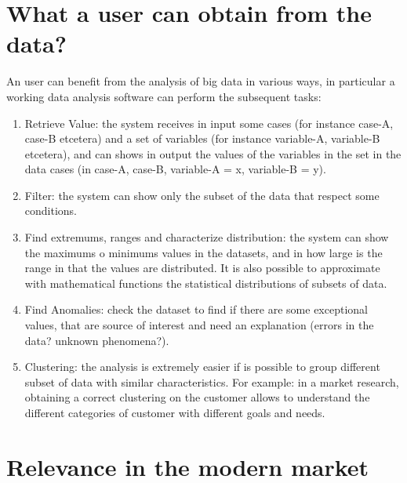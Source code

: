 \section{What a user can obtain from the data?}

An user can benefit from the analysis of big data in various ways, in particular a working data analysis software can perform the subsequent tasks:

\begin{enumerate}

\item Retrieve Value: the system receives in input some cases (for instance case-A, case-B etcetera) and a set of variables (for instance variable-A, variable-B etcetera), and can shows in output the values of the variables in the set in the data cases (in case-A, case-B, variable-A = x, variable-B = y).

\item Filter: the system can show only the subset of the data that respect some conditions.

\item Find extremums, ranges and characterize distribution: the system can show the maximums o minimums values in the datasets, and in how large is the range in that the values are distributed. It is also possible to approximate with mathematical functions the statistical distributions of subsets of data. 

\item Find Anomalies: check the dataset to find if there are some exceptional values, that are source of interest and need an explanation (errors in the data? unknown phenomena?).

\item Clustering: the analysis is extremely easier if is possible to group different subset of data with similar characteristics. For example: in a market research, obtaining a correct clustering on the customer allows to understand the different categories of customer with different goals and needs.      

\end{enumerate}

\section{Relevance in the modern market}

